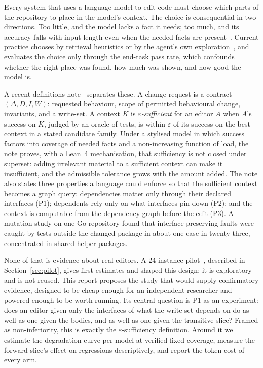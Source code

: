 \documentclass[10pt,conference]{IEEEtran}
\newcommand{\eps}{\varepsilon}
\begin{document}
Every system that uses a language model to edit code must choose which parts of the repository to place in the model's context. The choice is consequential in two directions. Too little, and the model lacks a fact it needs; too much, and its accuracy falls with input length even when the needed facts are present~\cite{liu2024lost,levy2024same,du2025length}. Current practice chooses by retrieval heuristics or by the agent's own exploration~\cite{xia2025agentless,bairi2024codeplan}, and evaluates the choice only through the end-task pass rate, which confounds whether the right place was found, how much was shown, and how good the model is.

A recent definitions note~\cite{johansen2026note} separates these. A change request is a contract $(\Delta, D, I, W)$: requested behaviour, scope of permitted behavioural change, invariants, and a write-set. A context $K$ is \emph{$\eps$-sufficient} for an editor $A$ when $A$'s success on $K$, judged by an oracle of tests, is within $\eps$ of its success on the best context in a stated candidate family. Under a stylised model in which success factors into coverage of needed facts and a non-increasing function of load, the note proves, with a Lean~4 mechanisation, that sufficiency is not closed under superset: adding irrelevant material to a sufficient context can make it insufficient, and the admissible tolerance grows with the amount added. The note also states three properties a language could enforce so that the sufficient context becomes a graph query: dependencies matter only through their declared interfaces (P1); dependents rely only on what interfaces pin down (P2); and the context is computable from the dependency graph before the edit (P3). A mutation study on one Go repository found that interface-preserving faults were caught by tests outside the changed package in about one case in twenty-three, concentrated in shared helper packages.

None of that is evidence about real editors. A 24-instance pilot~\cite{johansen2026pilot}, described in Section~\ref{sec:pilot}, gives first estimates and shaped this design; it is exploratory and is not reused. This report proposes the study that would supply confirmatory evidence, designed to be cheap enough for an independent researcher and powered enough to be worth running. Its central question is P1 as an experiment: does an editor given only the interfaces of what the write-set depends on do as well as one given the bodies, and as well as one given the transitive slice? Framed as non-inferiority, this is exactly the $\eps$-sufficiency definition. Around it we estimate the degradation curve per model at verified fixed coverage, measure the forward slice's effect on regressions descriptively, and report the token cost of every arm.
\end{document}
